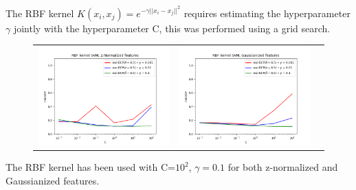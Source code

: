 \documentclass[12pt,a4paper]{article}
\begin{document}
The RBF kernel $K(x_i, x_j) = e^{-\gamma||x_i - x_j||^2}$ requires estimating the hyperparameter $\gamma$ jointly with the hyperparameter C, this was performed using a grid search.
\begin{figure}[H]
    \begin{center}
        \hspace*{-25pt}
        \begin{tabular}{ccc}
            \includegraphics[width = 200pt]{img/evaluation_plots/rbf-svm-z-normalized-C-gamma.png} &
            \includegraphics[width = 200pt]{img/evaluation_plots/rbf-svm-gaussianized-C-gamma.png}   \\
        \end{tabular}
    \end{center}
\end{figure}

\vspace{-20pt}
\noindent
The RBF kernel has been used with C=$10^2$, $\gamma=0.1$ for both z-normalized and Gaussianized features. \\
\end{document}
